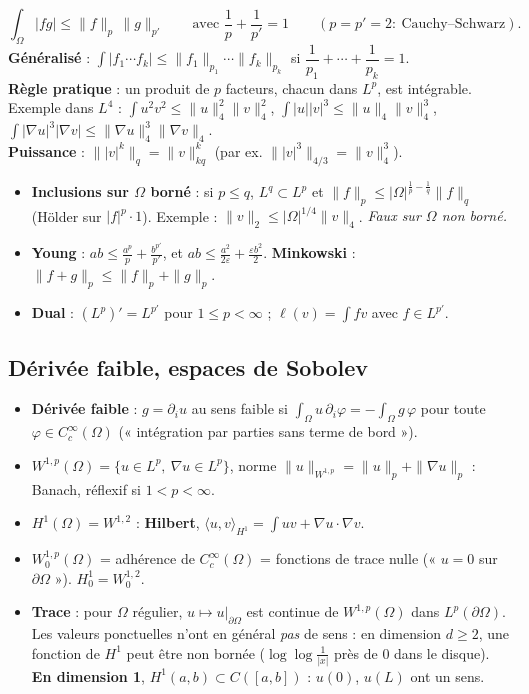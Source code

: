 \documentclass[10pt,a4paper]{article}
\newcommand{\sca}[2]{\langle #1,#2\rangle}
\newcommand{\nr}[1]{\|#1\|}
\newcommand{\eps}{\varepsilon}
\begin{document}
\begin{retenir}
\[\int_\Omega|fg|\le\nr f_p\,\nr g_{p'}\qquad\text{avec }\frac1p+\frac1{p'}=1\qquad(p=p'=2:\ \text{Cauchy--Schwarz}).\]
\textbf{Généralisé} : $\displaystyle\int|f_1\cdots f_k|\le\nr{f_1}_{p_1}\cdots\nr{f_k}_{p_k}$ si $\dfrac1{p_1}+\cdots+\dfrac1{p_k}=1$.\\
\textbf{Règle pratique} : un produit de $p$ facteurs, chacun dans $L^p$, est intégrable. Exemple dans $L^4$ : $\int u^2v^2\le\nr u_4^2\nr v_4^2$, $\int|u||v|^3\le\nr u_4\nr v_4^3$, $\int|\nabla u|^3|\nabla v|\le\nr{\nabla u}_4^3\nr{\nabla v}_4$.\\
\textbf{Puissance} : $\nr{|v|^k}_{q}=\nr v_{kq}^k$ (par ex. $\nr{|v|^3}_{4/3}=\nr v_4^3$).
\end{retenir}
\begin{itemize}
\item \textbf{Inclusions sur $\Omega$ borné} : si $p\le q$, $L^q\subset L^p$ et $\nr f_p\le|\Omega|^{\frac1p-\frac1q}\nr f_q$ (Hölder sur $|f|^p\cdot1$). Exemple : $\nr v_2\le|\Omega|^{1/4}\nr v_4$. \emph{Faux sur $\Omega$ non borné.}
\item \textbf{Young} : $ab\le\frac{a^p}p+\frac{b^{p'}}{p'}$, et $ab\le\frac{a^2}{2\eps}+\frac{\eps b^2}2$. \textbf{Minkowski} : $\nr{f+g}_p\le\nr f_p+\nr g_p$.
\item \textbf{Dual} : $(L^p)'=L^{p'}$ pour $1\le p<\infty$ ; $\ell(v)=\int fv$ avec $f\in L^{p'}$.
\end{itemize}

\subsection{Dérivée faible, espaces de Sobolev}
\begin{itemize}
\item \textbf{Dérivée faible} : $g=\partial_iu$ au sens faible si $\int_\Omega u\,\partial_i\varphi=-\int_\Omega g\,\varphi$ pour toute $\varphi\in C^\infty_c(\Omega)$ (« intégration par parties sans terme de bord »).
\item $W^{1,p}(\Omega)=\{u\in L^p,\ \nabla u\in L^p\}$, norme $\nr u_{W^{1,p}}=\nr u_p+\nr{\nabla u}_p$ : Banach, réflexif si $1<p<\infty$.
\item $H^1(\Omega)=W^{1,2}$ : \textbf{Hilbert}, $\sca uv_{H^1}=\int uv+\nabla u\cdot\nabla v$.
\item $W^{1,p}_0(\Omega)$ = adhérence de $C^\infty_c(\Omega)$ = fonctions de trace nulle (« $u=0$ sur $\partial\Omega$ »). $H^1_0=W^{1,2}_0$.
\item \textbf{Trace} : pour $\Omega$ régulier, $u\mapsto u|_{\partial\Omega}$ est continue de $W^{1,p}(\Omega)$ dans $L^p(\partial\Omega)$. Les valeurs ponctuelles n'ont en général \emph{pas} de sens : en dimension $d\ge2$, une fonction de $H^1$ peut être non bornée ($\log\log\frac1{|x|}$ près de 0 dans le disque). \textbf{En dimension 1}, $H^1(a,b)\subset C([a,b])$ : $u(0)$, $u(L)$ ont un sens.
\end{itemize}
\end{document}
